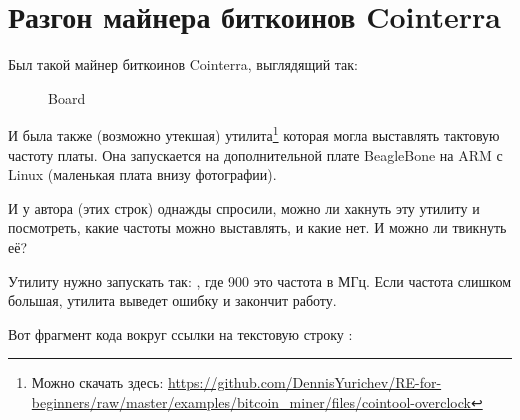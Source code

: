 \section{Разгон майнера биткоинов Cointerra}

Был такой майнер биткоинов Cointerra, выглядящий так:

\begin{figure}[H]
\centering
{}
\caption{Board}
\end{figure}

И была также (возможно утекшая) утилита\footnote{Можно скачать здесь: \url{https://github.com/DennisYurichev/RE-for-beginners/raw/master/examples/bitcoin_miner/files/cointool-overclock}}
которая могла выставлять тактовую частоту платы.
Она запускается на дополнительной плате BeagleBone на ARM с Linux (маленькая плата внизу фотографии).

И у автора (этих строк) однажды спросили, можно ли хакнуть эту утилиту и посмотреть, какие частоты можно выставлять, и какие нет.
И можно ли твикнуть её?

Утилиту нужно запускать так: , где 900 это частота в МГц.
Если частота слишком большая, утилита выведет ошибку  и закончит работу.

Вот фрагмент кода вокруг ссылки на текстовую строку :

